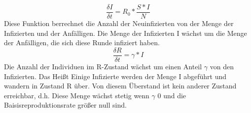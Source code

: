 \begin{equation}
\frac{\delta I }{\delta t} = R_0 * \frac{S * I}{N}
\end{equation}
Diese Funktion berrechnet die Anzahl der Neuinfizierten von der Menge der Infizierten und der Anfälligen. Die Menge der Infizierten I wächst um die Menge der Anfälligen, die sich diese Runde infiziert haben.
\begin{equation}
\frac{\delta R }{\delta t} = \gamma * I
\end{equation}
Die Anzahl der Individuen im R-Zustand wächst um einen Anteil $\gamma$ von den Infizierten. Das Heißt Einige Infizierte werden der Menge I abgeführt und wandern in Zustand R über. Von diesem Überstand ist kein anderer Zustand erreichbar, d.h. Diese Menge wächst stetig wenn $\gamma$ 0 und die Baisisreproduktionsrate größer null sind.


